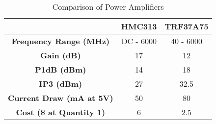 \begin{table}[H]
	\caption{Comparison of Power Amplifiers}
	\label{table:power_amps}
	\centering
\begin{tabular}{|c|c|c|}
	\hline
	\multicolumn{1}{|l|}{}           & \textbf{HMC313} & \textbf{TRF37A75} \\ \hline
	\textbf{Frequency Range (MHz)}   & DC - 6000       & 40 - 6000         \\ \hline
	\textbf{Gain (dB)}               & 17              & 12                \\ \hline
	\textbf{P1dB (dBm)}              & 14              & 18                \\ \hline
	\textbf{IP3 (dBm)}               & 27              & 32.5              \\ \hline
	\textbf{Current Draw (mA at 5V)} & 50              & 80                \\ \hline
	\textbf{Cost (\$ at Quantity 1)} & 6               & 2.5               \\ \hline
\end{tabular}
\end{table}
\vspace{-1em}
